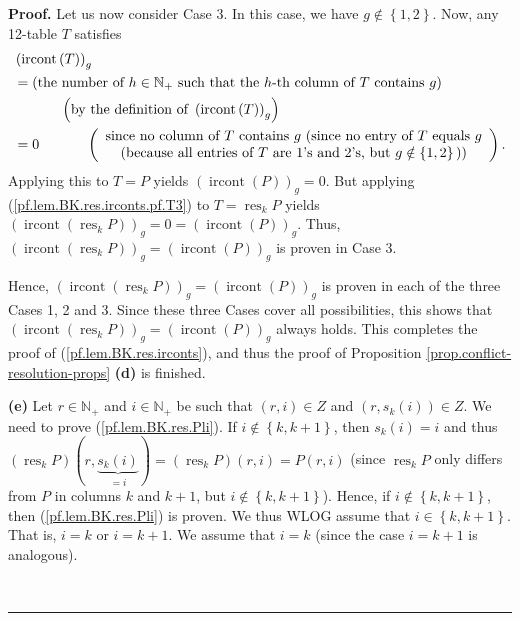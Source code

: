 \documentclass[numbers=enddot,12pt,final,onecolumn,notitlepage]{scrartcl}%
\theoremstyle{definition}
\newenvironment{proof}[1][Proof]{\noindent\textbf{#1.} }{\ \rule{0.5em}{0.5em}}
\begin{document}
\begin{proof}
Let us now consider Case 3. In this case, we have $g\notin\left\{
1,2\right\}  $. Now, any 12-table $T$ satisfies%
\begin{align}
&  \left(  \operatorname*{ircont}\left(  T\right)  \right)  _{g}\nonumber\\
&  =\left(  \text{the number of }h\in\mathbb{N}_{+}\text{ such that the
}h\text{-th column of }T\text{ contains }g\right) \nonumber\\
&  \ \ \ \ \ \ \ \ \ \ \left(  \text{by the definition of }\left(
\operatorname*{ircont}\left(  T\right)  \right)  _{g}\right) \nonumber\\
&  =0\ \ \ \ \ \ \ \ \ \ \left(
\begin{array}
[c]{c}%
\text{since no column of }T\text{ contains }g\text{ (since no entry of
}T\text{ equals }g\\
\text{(because all entries of }T\text{ are }1\text{'s and }2\text{'s, but
}g\notin\left\{  1,2\right\}  \text{))}%
\end{array}
\right)  . \label{pf.lem.BK.res.irconts.pf.T3}%
\end{align}
Applying this to $T=P$ yields $\left(  \operatorname*{ircont}\left(  P\right)
\right)  _{g}=0$. But applying (\ref{pf.lem.BK.res.irconts.pf.T3}) to
$T=\operatorname*{res}\nolimits_{k}P$ yields $\left(  \operatorname*{ircont}%
\left(  \operatorname*{res}\nolimits_{k}P\right)  \right)  _{g}=0=\left(
\operatorname*{ircont}\left(  P\right)  \right)  _{g}$. Thus, $\left(
\operatorname*{ircont}\left(  \operatorname*{res}\nolimits_{k}P\right)
\right)  _{g}=\left(  \operatorname*{ircont}\left(  P\right)  \right)  _{g}$
is proven in Case 3.

Hence, $\left(  \operatorname*{ircont}\left(  \operatorname*{res}%
\nolimits_{k}P\right)  \right)  _{g}=\left(  \operatorname*{ircont}\left(
P\right)  \right)  _{g}$ is proven in each of the three Cases 1, 2 and 3.
Since these three Cases cover all possibilities, this shows that $\left(
\operatorname*{ircont}\left(  \operatorname*{res}\nolimits_{k}P\right)
\right)  _{g}=\left(  \operatorname*{ircont}\left(  P\right)  \right)  _{g}$
always holds. This completes the proof of (\ref{pf.lem.BK.res.irconts}), and
thus the proof of Proposition \ref{prop.conflict-resolution-props}
\textbf{(d)} is finished.

\textbf{(e)} Let $r\in\mathbb{N}_{+}$ and $i\in\mathbb{N}_{+}$ be such that
$\left(  r,i\right)  \in Z$ and $\left(  r,s_{k}\left(  i\right)  \right)  \in
Z$. We need to prove (\ref{pf.lem.BK.res.Pli}). If $i\notin\left\{
k,k+1\right\}  $, then $s_{k}\left(  i\right)  =i$ and thus $\left(
\operatorname*{res}\nolimits_{k}P\right)  \left(  r,\underbrace{s_{k}\left(
i\right)  }_{=i}\right)  =\left(  \operatorname*{res}\nolimits_{k}P\right)
\left(  r,i\right)  =P\left(  r,i\right)  $ (since $\operatorname*{res}%
\nolimits_{k}P$ only differs from $P$ in columns $k$ and $k+1$, but
$i\notin\left\{  k,k+1\right\}  $). Hence, if $i\notin\left\{  k,k+1\right\}
$, then (\ref{pf.lem.BK.res.Pli}) is proven. We thus WLOG assume that
$i\in\left\{  k,k+1\right\}  $. That is, $i=k$ or $i=k+1$. We assume that
$i=k$ (since the case $i=k+1$ is analogous).


\end{proof}
\end{document}
